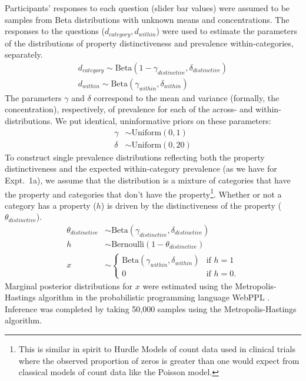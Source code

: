 \documentclass[10pt,letterpaper]{article}
\begin{document}
Participants' responses to each question (slider bar values) were assumed to be samples from Beta distributions with unknown means and concentrations. 
The responses to the questions ($d_{category}, d_{within}$) were used to estimate the parameters of the distributions of property distinctiveness and prevalence within-categories, separately. 
\begin{align*}
d_{category} \sim \text{Beta}(1-\gamma_{distinctive}, \delta_{distinctive}) \\
d_{within} \sim \text{Beta}(\gamma_{within}, \delta_{within}) 
\end{align*}
The parameters $\gamma$ and $\delta$ correspond to the mean and variance (formally, the concentration), respectively, of prevalence for each of the across- and within- distributions.
We put identical, uninformative priors on these parameters:
\begin{align*}
\gamma & \sim \text{Uniform}(0,1) \\
\delta & \sim \text{Uniform}(0,20) 
\end{align*}
To construct single prevalence distributions reflecting both the property distinctiveness and the expected within-category prevalence (as we have for Expt.~1a), we assume that the distribution is a mixture of categories that have the property and categories that don't have the property\footnote{This is similar in spirit to Hurdle Models of count data used in clinical trials where the observed proportion of zeros is greater than one would expect from classical models of count data like the Poisson model.}. 
Whether or not a category has a property ($h$) is driven by the distinctiveness of the property ($\theta_{distinctive}$).
%
\begin{align*}
\theta_{distinctive} & \sim \text{Beta}(\gamma_{distinctive}, \delta_{distinctive}) \\ 
h & \sim \text{Bernoulli}(1 - \theta_{distinctive}) \\
x & \sim \begin{cases} 
		\text{Beta}(\gamma_{within}, \delta_{within}) &\mbox{if } h = 1 \\ 
				0 & \mbox{if } h=0. 
				\end{cases} 
\end{align*}
%
Marginal posterior distributions for $x$ were estimated using the Metropolis-Hastings algorithm in the probabilistic programming language WebPPL \cite{dippl}. Inference was completed by taking 50,000 samples using the Metropolis-Hastings algorithm.
\end{document}
